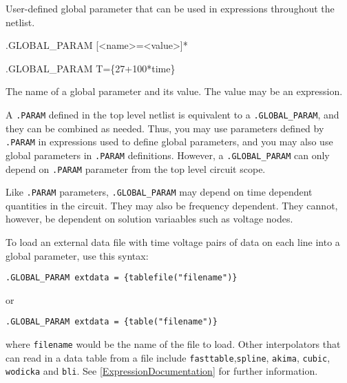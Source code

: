 

User-defined global parameter that can be used in expressions throughout the netlist.
\begin{Command}

\format
.GLOBAL\_PARAM [<name>=<value>]*

\examples
.GLOBAL\_PARAM T=\{27+100*time\}

\begin{Arguments}

The name of a global parameter and its value.  The value may be an expression.
\medskip

\end{Arguments}

\comments

A \texttt{.PARAM} 
defined in the top level netlist is equivalent to 
a \texttt{.GLOBAL\_PARAM}, and they can be combined as needed.
Thus, you may use parameters defined by \texttt{.PARAM} in expressions used to
define global parameters, and you may also use global parameters in
\texttt{.PARAM} definitions.    However, a \texttt{.GLOBAL\_PARAM} 
  can only depend on \texttt{.PARAM} parameter from the top level circuit scope.

Like \texttt{.PARAM} parameters, \texttt{.GLOBAL\_PARAM} may
depend on time dependent quantities in the circuit.  They may also
be frequency dependent.  They cannot, however, be 
dependent on solution variaables such as voltage nodes.

To load an external data file with time voltage pairs of data on each 
line into a global parameter, use this syntax:

\texttt{.GLOBAL\_PARAM extdata = \{tablefile("filename")\}}

or

\texttt{.GLOBAL\_PARAM extdata = \{table("filename")\}}

where \texttt{filename} would be the name of the file to load.  
Other interpolators that can read in a data table from a file 
include \texttt{fasttable},\texttt{spline}, \texttt{akima}, \texttt{cubic}, 
\texttt{wodicka} and \texttt{bli}.  See \ref{ExpressionDocumentation} 
for further information. 


\end{Command}
